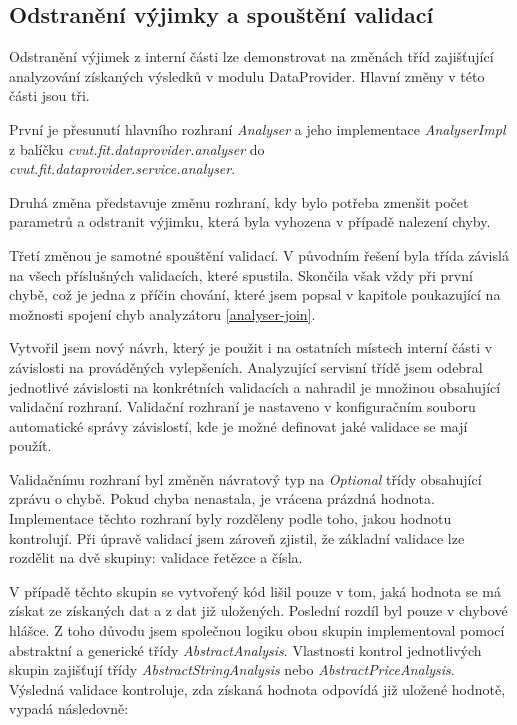 \documentclass[thesis=B,czech]{FITthesis}[2012/06/26]
\begin{document}
\subsection{Odstranění výjimky a spouštění validací}
Odstranění výjimek z interní části lze demonstrovat na změnách tříd zajišťující analyzování získaných výsledků v modulu DataProvider. Hlavní změny v této části jsou tři.
\par
První je přesunutí hlavního rozhraní \textit{Analyser} a jeho implementace
\textit{AnalyserImpl} z balíčku \textit{cvut.fit.dataprovider.analyser} 
do  \\
\textit{cvut.fit.dataprovider.service.analyser}. 
\par
Druhá změna představuje změnu rozhraní, kdy bylo potřeba
zmenšit počet parametrů a odstranit výjimku, která byla vyhozena v případě nalezení chyby. 
\par
Třetí změnou je samotné spouštění validací. V původním řešení byla třída závislá na všech příslušných validacích, které spustila.
Skončila však vždy při první chybě, což je jedna 
z příčin chování, které jsem popsal v kapitole poukazující na možnosti spojení chyb analyzátoru \autoref{analyser-join}.
\par
Vytvořil jsem nový návrh, který je použit i na ostatních místech interní části v závislosti na
prováděných vylepšeních. Analyzující servisní třídě jsem odebral jednotlivé závislosti na konkrétních validacích a nahradil je množinou 
obsahující validační rozhraní. Validační rozhraní je nastaveno v konfiguračním souboru automatické správy závislostí, kde je možné
definovat jaké validace se mají použít.
\par
Validačnímu rozhraní byl změněn návratový typ na \textit{Optional} třídy obsahující zprávu o chybě. Pokud chyba nenastala, je vrácena
prázdná hodnota. Implementace těchto rozhraní byly rozděleny podle toho, jakou hodnotu kontrolují.
Při úpravě validací jsem zároveň zjistil, že základní validace lze rozdělit na dvě skupiny: validace řetězce a čísla.
\par
V případě těchto skupin se vytvořený kód lišil pouze v tom, jaká hodnota se má získat ze získaných dat a z dat již uložených.
Poslední rozdíl byl pouze v chybové hlášce. Z toho důvodu jsem společnou logiku obou skupin implementoval
pomocí abstraktní a generické třídy \textit{AbstractAnalysis}. Vlastnosti kontrol jednotlivých skupin zajišťují třídy \textit{AbstractStringAnalysis} 
nebo \textit{AbstractPriceAnalysis}. Výsledná validace kontroluje, zda získaná hodnota odpovídá již uložené hodnotě, vypadá následovně:
\end{document}
